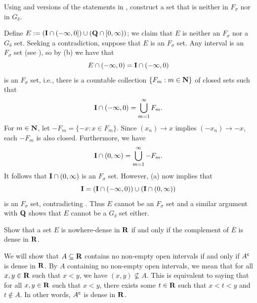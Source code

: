 \documentclass{lew98_solutions}
\begin{document}
\begin{exercise}
\label{ex:3.5.7}
    Using  and versions of the statements in , construct a set that is neither in \( F_{\sigma} \) nor in \( G_{\delta} \).
\end{exercise}

\begin{solution}
    Define \( E := (\mathbf{I} \cap (-\infty, 0]) \cup (\mathbf{Q} \cap [0, \infty)) \); we claim that \( E \) is neither an \( F_{\sigma} \) nor a \( G_{\delta} \) set. Seeking a contradiction, suppose that \( E \) is an \( F_{\sigma} \) set. Any interval is an \( F_{\sigma} \) set (see ), so by  (b) we have that
    \[
        E \cap (-\infty, 0) = \mathbf{I} \cap (-\infty, 0)
    \]
    is an \( F_{\sigma} \) set, i.e., there is a countable collection \( \{ F_m : m \in \mathbf{N} \} \) of closed sets such that
    \[
        \mathbf{I} \cap (-\infty, 0) = \bigcup_{m=1}^{\infty} F_m.  
    \]
    For \( m \in \mathbf{N} \), let \( -F_m = \{ -x : x \in F_m \} \). Since \( (x_n) \to x \) implies \( (-x_n) \to -x \), each \( -F_m \) is also closed. Furthermore, we have
    \[
        \mathbf{I} \cap (0, \infty) = \bigcup_{m=1}^{\infty} -F_m.
    \]
    It follows that \( \mathbf{I} \cap (0, \infty) \) is an \( F_{\sigma} \) set. However,  (a) now implies that
    \[
        \mathbf{I} = (\mathbf{I} \cap (-\infty, 0)) \cup (\mathbf{I} \cap (0, \infty))
    \]
    is an \( F_{\sigma} \) set, contradicting . Thus \( E \) cannot be an \( F_{\sigma} \) set and a similar argument with \( \mathbf{Q} \) shows that \( E \) cannot be a \( G_{\delta} \) set either.
\end{solution}

\begin{exercise}
\label{ex:3.5.8}
    Show that a set \( E \) is nowhere-dense in \( \mathbf{R} \) if and only if the complement of \( \overline{E} \) is dense in \( \mathbf{R} \).
\end{exercise}

\begin{solution}
    We will show that \( A \subseteq \mathbf{R} \) contains no non-empty open intervals if and only if \( A^{\mathsf{c}} \) is dense in \( \mathbf{R} \). By \( A \) containing no non-empty open intervals, we mean that for all \( x, y \in \mathbf{R} \) such that \( x < y \), we have \( (x, y) \not\subseteq A \). This is equivalent to saying that for all \( x, y \in \mathbf{R} \) such that \( x < y \), there exists some \( t \in \mathbf{R} \) such that \( x < t < y \) and \( t \not\in A \). In other words, \( A^{\mathsf{c}} \) is dense in \( \mathbf{R} \).
\end{solution}
\end{document}
